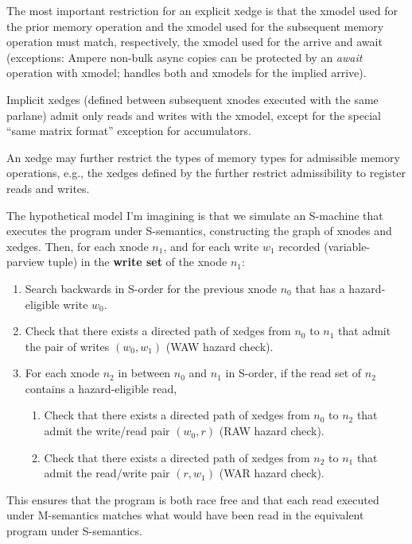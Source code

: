 \filbreak
The most important restriction for an explicit xedge is that the xmodel used for the prior memory operation and the xmodel used for the subsequent memory operation must match, respectively, the xmodel used for the arrive and await (exceptions: Ampere non-bulk async copies can be protected by an \textit{await} operation with  xmodel;  handles both  and  xmodels for the implied arrive).

\filbreak
Implicit xedges (defined between subsequent xnodes executed with the same parlane) admit only reads and writes with the  xmodel, except for the special ``same matrix format'' exception for  accumulators.

\filbreak
An xedge may further restrict the types of memory types for admissible memory operations, e.g., the xedges defined by the  further restrict admissibility to register reads and writes.

\filbreak
{}

The hypothetical model I'm imagining is that we simulate an S-machine that executes the program under S-semantics, constructing the graph of xnodes and xedges. Then, for each xnode $n_1$, and for each write $w_1$ recorded (variable-parview tuple) in the \textbf{write set} of the xnode $n_1$:
\begin{enumerate}
  \item Search backwards in S-order for the previous xnode $n_0$ that has a hazard-eligible write $w_0$.
  \item Check that there exists a directed path of xedges from $n_0$ to $n_1$ that admit the pair of writes $(w_0, w_1)$ (WAW hazard check).
  \item For each xnode $n_2$ in between $n_0$ and $n_1$ in S-order, if the read set of $n_2$ contains a hazard-eligible read,
  \begin{enumerate}
    \item Check that there exists a directed path of xedges from $n_0$ to $n_2$ that admit the write/read pair $(w_0, r)$ (RAW hazard check).
    \item Check that there exists a directed path of xedges from $n_2$ to $n_1$ that admit the read/write pair $(r, w_1)$ (WAR hazard check).
  \end{enumerate}
\end{enumerate}
This ensures that the program is both race free and that each read executed under M-semantics matches what would have been read in the equivalent program under S-semantics.

